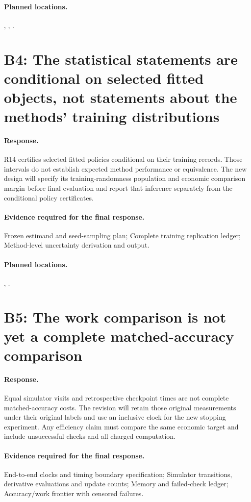 \paragraph*{Planned locations.} , , .

\section*{B4: The statistical statements are conditional on selected fitted objects, not statements about the methods' training distributions}
\paragraph*{Response.} R14 certifies selected fitted policies conditional on their training records. Those intervals do not establish expected method performance or equivalence. The new design will specify its training-randomness population and economic comparison margin before final evaluation and report that inference separately from the conditional policy certificates.
\paragraph*{Evidence required for the final response.} Frozen estimand and seed-sampling plan; Complete training replication ledger; Method-level uncertainty derivation and output.
\paragraph*{Planned locations.} , .

\section*{B5: The work comparison is not yet a complete matched-accuracy comparison}
\paragraph*{Response.} Equal simulator visits and retrospective checkpoint times are not complete matched-accuracy costs. The revision will retain those original measurements under their original labels and use an inclusive clock for the new stopping experiment. Any efficiency claim must compare the same economic target and include unsuccessful checks and all charged computation.
\paragraph*{Evidence required for the final response.} End-to-end clocks and timing boundary specification; Simulator transitions, derivative evaluations and update counts; Memory and failed-check ledger; Accuracy/work frontier with censored failures.
